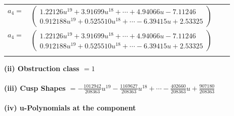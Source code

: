 \documentclass[1p]{elsarticle_modified}
\theoremstyle{definition}
\begin{document}
\begin{tabular}{m{7pt} m{180pt} m{7pt} m{180pt} }
\flushright $a_{4}=$&$\begin{pmatrix}1.22126 u^{19}+3.91699 u^{18}+\cdots+4.94066 u-7.11246\\0.912188 u^{19}+0.525510 u^{18}+\cdots-6.39415 u+2.53325\end{pmatrix}$\\ \flushright $a_{4}=$&$\begin{pmatrix}1.22126 u^{19}+3.91699 u^{18}+\cdots+4.94066 u-7.11246\\0.912188 u^{19}+0.525510 u^{18}+\cdots-6.39415 u+2.53325\end{pmatrix}$\\&\end{tabular}
\flushleft \textbf{(ii) Obstruction class $= 1$}\\~\\
\flushleft \textbf{(iii) Cusp Shapes $= -\frac{1012942}{208363} u^{19}-\frac{1169627}{208363} u^{18}+\cdots-\frac{402660}{208363} u+\frac{907180}{208363}$}\\~\\
\newpage\renewcommand{\arraystretch}{1}
\flushleft \textbf{(iv) u-Polynomials at the component}\newline \\
\end{document}

